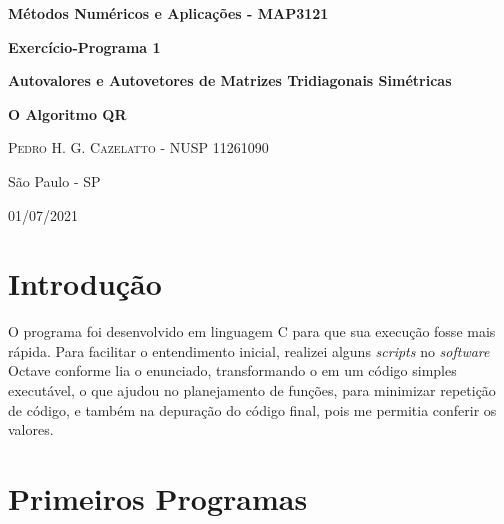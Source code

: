 \documentclass[12pt]{article} %
\begin{document}
\begin{titlepage}
    \begin{center}
        
        \LARGE{\textbf{Métodos Numéricos e Aplicações - MAP3121}}
        
        \vspace{20pt}
        
        \LARGE{\textbf{Exercício-Programa 1}}
        
        \vspace{200pt}
        
        \LARGE{\textbf{Autovalores e Autovetores de Matrizes Tridiagonais Simétricas}}
        
        \vspace{40pt}
        
        \LARGE{\textbf{O Algoritmo QR}}
        
        \vspace{80pt}
        
        \begin{flushright}
            \Large{\textsc{Pedro H. G. Cazelatto - NUSP 11261090}}
        \end{flushright}
        
        \vfill
        
        São Paulo - SP
        
        01/07/2021
        
    \end{center}
\end{titlepage}

\section{Introdução}

    O programa foi desenvolvido em linguagem C para que sua execução fosse mais rápida. Para facilitar o entendimento inicial, realizei alguns \textit{scripts} no \textit{software} Octave conforme lia o enunciado, transformando o  em um código simples executável, o que ajudou no planejamento de funções, para minimizar repetição de código, e também na depuração do código final, pois me permitia conferir os valores.

    \vfill
    
\section{Primeiros Programas}
    
\end{document}

